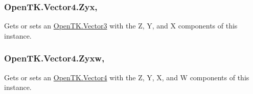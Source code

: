 \hypertarget{struct_open_t_k_1_1_vector4_ad2129a92b63e940bc2348b5fc0b166c9}{
\subsubsection[{Zyx}]{ Open\-T\-K.\-Vector4.\-Zyx\hspace{0.3cm}{\ttfamily [get]}, {\ttfamily [set]}}}\label{struct_open_t_k_1_1_vector4_ad2129a92b63e940bc2348b5fc0b166c9}


Gets or sets an \hyperlink{struct_open_t_k_1_1_vector3}{Open\-T\-K.\-Vector3} with the Z, Y, and X components of this instance. 

\hypertarget{struct_open_t_k_1_1_vector4_ab29481fc7450aaa07ad020e4b8f6aff3}{
\subsubsection[{Zyxw}]{ Open\-T\-K.\-Vector4.\-Zyxw\hspace{0.3cm}{\ttfamily [get]}, {\ttfamily [set]}}}\label{struct_open_t_k_1_1_vector4_ab29481fc7450aaa07ad020e4b8f6aff3}


Gets or sets an \hyperlink{struct_open_t_k_1_1_vector4}{Open\-T\-K.\-Vector4} with the Z, Y, X, and W components of this instance. 

